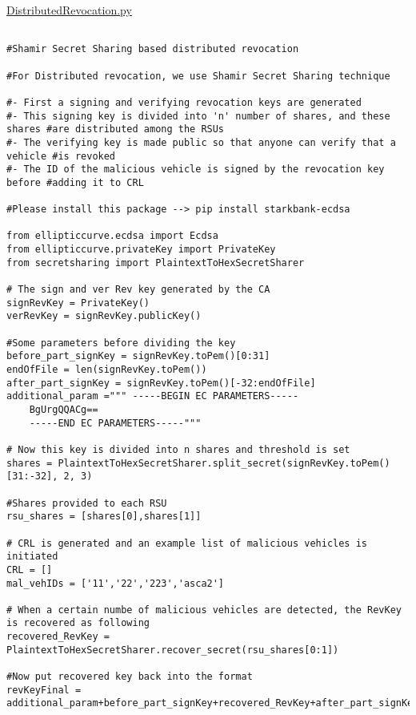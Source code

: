 \begin{linenumbers}
\begin{lstlisting}

\end{lstlisting}
\resetlinenumber[1]
\hypertarget{milp_code}{}
\hyperlink{milp_text}{DistributedRevocation.py}
\begin{lstlisting}

#Shamir Secret Sharing based distributed revocation

#For Distributed revocation, we use Shamir Secret Sharing technique

#- First a signing and verifying revocation keys are generated 
#- This signing key is divided into 'n' number of shares, and these shares #are distributed among the RSUs
#- The verifying key is made public so that anyone can verify that a vehicle #is revoked
#- The ID of the malicious vehicle is signed by the revocation key before #adding it to CRL 

#Please install this package --> pip install starkbank-ecdsa

from ellipticcurve.ecdsa import Ecdsa
from ellipticcurve.privateKey import PrivateKey
from secretsharing import PlaintextToHexSecretSharer

# The sign and ver Rev key generated by the CA
signRevKey = PrivateKey()
verRevKey = signRevKey.publicKey()

#Some parameters before dividing the key
before_part_signKey = signRevKey.toPem()[0:31]
endOfFile = len(signRevKey.toPem())
after_part_signKey = signRevKey.toPem()[-32:endOfFile]
additional_param =""" -----BEGIN EC PARAMETERS-----
    BgUrgQQACg==
    -----END EC PARAMETERS-----"""

# Now this key is divided into n shares and threshold is set
shares = PlaintextToHexSecretSharer.split_secret(signRevKey.toPem()[31:-32], 2, 3)

#Shares provided to each RSU
rsu_shares = [shares[0],shares[1]]

# CRL is generated and an example list of malicious vehicles is initiated
CRL = []
mal_vehIDs = ['11','22','223','asca2']

# When a certain numbe of malicious vehicles are detected, the RevKey is recovered as following
recovered_RevKey = PlaintextToHexSecretSharer.recover_secret(rsu_shares[0:1])

#Now put recovered key back into the format
revKeyFinal = additional_param+before_part_signKey+recovered_RevKey+after_part_signKey 


\end{lstlisting}
\end{linenumbers}
